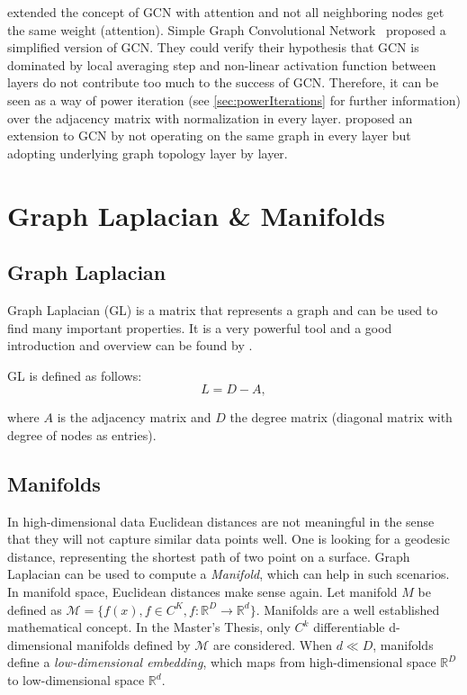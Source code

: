 \citet{GAT} extended the concept of GCN with attention and not all neighboring nodes get the same weight (attention).
Simple Graph Convolutional Network~\cite{simpleGCN} proposed a simplified version of GCN.
They could verify their hypothesis that GCN is dominated by local averaging step and non-linear 
activation function between layers do not contribute too much to the success of GCN. 
Therefore, it can be seen as a way of power iteration (see \ref{sec:powerIterations} \textit{} for further information) over the adjacency matrix with normalization in every layer.
\citet{dynamicGCN} proposed an extension to GCN by not operating on the same graph in every layer but adopting
underlying graph topology layer by layer.

\section{Graph Laplacian \& Manifolds}
\subsection{Graph Laplacian}
Graph Laplacian (GL) is a matrix that represents a graph and can be used to find many important properties.
It is a very powerful tool and a good introduction and overview can be found by \cite{tutorialSpectralClustering, SpectralGraphTheory}. 

GL is defined as follows:
\begin{equation}
    \label{eq:gl}
    L = D - A,
\end{equation}

where $A$ is the adjacency matrix and $D$ the degree matrix (diagonal matrix with degree of nodes as entries).

\subsection{Manifolds}
\label{sec:manifolds}

In high-dimensional data Euclidean distances are not meaningful
in the sense that they will not capture similar data points well. One is looking for a geodesic distance, 
representing the shortest path of two point on a surface.
Graph Laplacian can be used to compute a \textit{Manifold}, which can help in such scenarios. 
In manifold space, Euclidean distances make sense again. 
Let manifold $M$ be defined as $\mathcal{M} = \{ f(x), f \in C^K, f: \mathbb{R}^D \to \mathbb{R}^d \}$.
Manifolds are a well established mathematical concept. In the Master's Thesis, only 
$C^k$ differentiable d-dimensional manifolds defined by $\mathcal{M}$ are considered. 
When $d \ll D$, manifolds define a \textit{low-dimensional embedding}, which maps from high-dimensional space 
$\mathbb{R}^D$ to low-dimensional space $\mathbb{R}^d$.

